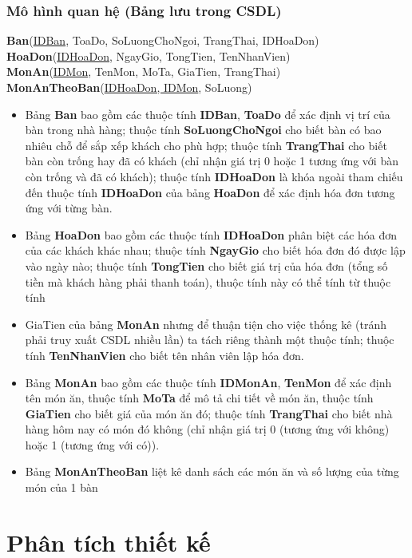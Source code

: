 \documentclass[a4paper,12pt]{report}
\begin{document}
\subsection{Mô hình quan hệ (Bảng lưu trong CSDL)}
\textbf{Ban}(\underline{IDBan}, ToaDo, SoLuongChoNgoi, TrangThai, IDHoaDon)\\
\textbf{HoaDon}(\underline{IDHoaDon}, NgayGio, TongTien, TenNhanVien)\\
\textbf{MonAn}(\underline{IDMon}, TenMon, MoTa, GiaTien, TrangThai)\\  
\textbf{MonAnTheoBan}(\underline{IDHoaDon, IDMon}, SoLuong) 

\begin{itemize}
\item Bảng \textbf{Ban} bao gồm các thuộc tính \textbf{IDBan}, \textbf{ToaDo} để xác định vị trí của bàn trong nhà hàng; thuộc tính \textbf{SoLuongChoNgoi} cho biết bàn có bao nhiêu chỗ để sắp xếp khách cho phù hợp; thuộc tính \textbf{TrangThai} cho biết bàn còn trống hay đã có khách (chỉ nhận giá trị 0 hoặc 1 tương ứng với bàn còn trống và đã có khách); thuộc tính \textbf{IDHoaDon} là khóa ngoài tham chiếu đến thuộc tính \textbf{IDHoaDon} của bảng \textbf{HoaDon} để xác định hóa đơn tương ứng với từng bàn.
\item Bảng \textbf{HoaDon} bao gồm các thuộc tính \textbf{IDHoaDon} phân biệt các hóa đơn của các khách khác nhau; thuộc tính \textbf{NgayGio} cho biết hóa đơn đó được lập vào ngày nào; thuộc tính \textbf{TongTien} cho biết giá trị của hóa đơn (tổng số tiền mà khách hàng phải thanh toán), thuộc tính này có thể tính từ thuộc tính \item{GiaTien} của bảng \textbf{MonAn} nhưng để thuận tiện cho việc thống kê (tránh phải truy xuất CSDL nhiều lần) ta tách riêng thành một thuộc tính; thuộc tính \textbf{TenNhanVien} cho biết tên nhân viên lập hóa đơn.
\item Bảng \textbf{MonAn} bao gồm các thuộc tính \textbf{IDMonAn}, \textbf{TenMon} để xác định tên món ăn, thuộc tính \textbf{MoTa} để mô tả chi tiết về món ăn, thuộc tính \textbf{GiaTien} cho biết giá của món ăn đó; thuộc tính \textbf{TrangThai} cho biết nhà hàng hôm nay có món đó không (chỉ nhận giá trị 0 (tương ứng với không) hoặc 1 (tương ứng với có)).
\item Bảng \textbf{MonAnTheoBan} liệt kê danh sách các món ăn và số lượng của từng món của 1 bàn   
\end{itemize}

\chapter{Phân tích thiết kế}
\end{document}
